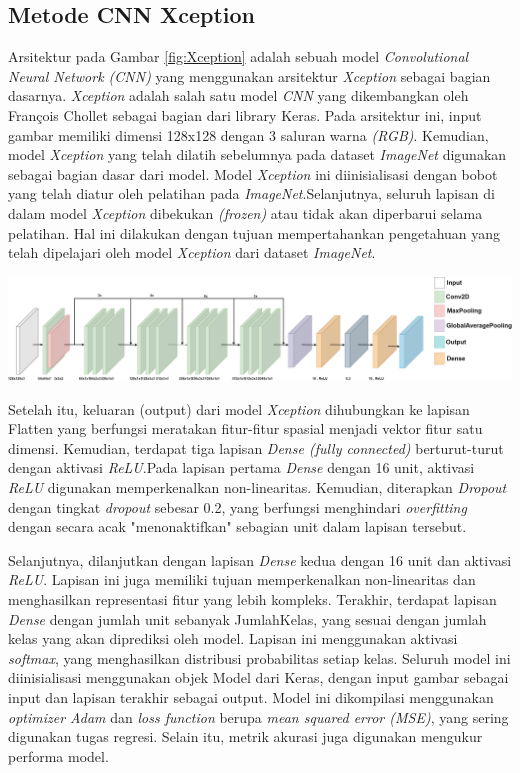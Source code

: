 \subsection{Metode CNN Xception}
Arsitektur pada Gambar \ref{fig:Xception} adalah sebuah model \textit{Convolutional Neural Network (\textit{CNN})} yang menggunakan arsitektur \textit{Xception} sebagai bagian dasarnya. \textit{Xception} adalah salah satu model \textit{CNN} yang dikembangkan oleh François Chollet sebagai bagian dari library Keras. Pada arsitektur ini, input gambar memiliki dimensi 128x128 dengan 3 saluran warna \textit{(RGB)}. Kemudian, model \textit{Xception} yang telah dilatih sebelumnya pada dataset \textit{ImageNet} digunakan sebagai bagian dasar dari model. Model \textit{Xception} ini diinisialisasi dengan bobot yang telah diatur oleh pelatihan pada \textit{ImageNet}.Selanjutnya, seluruh lapisan di dalam model \textit{Xception} dibekukan \textit{(frozen)} atau tidak akan diperbarui selama pelatihan. Hal ini dilakukan dengan tujuan mempertahankan pengetahuan yang telah dipelajari oleh model \textit{Xception} dari dataset \textit{ImageNet}.

\begin{center}
	\includegraphics[width=1.0\linewidth]{gambar/bener//Arsitektur_CNNXception_Modifikasi.png}
	\label{fig:Xception}
\end{center}
Setelah itu, keluaran (output) dari model \textit{Xception} dihubungkan ke lapisan Flatten yang berfungsi meratakan fitur-fitur spasial menjadi vektor fitur satu dimensi. Kemudian, terdapat tiga lapisan \textit{Dense (fully connected)} berturut-turut dengan aktivasi \textit{ReLU}.Pada lapisan pertama \textit{Dense} dengan 16 unit, aktivasi \textit{ReLU} digunakan memperkenalkan non-linearitas. Kemudian, diterapkan \textit{Dropout} dengan tingkat \textit{dropout} sebesar 0.2, yang berfungsi menghindari \textit{overfitting} dengan secara acak "menonaktifkan" sebagian unit dalam lapisan tersebut.

Selanjutnya, dilanjutkan dengan lapisan \textit{Dense} kedua dengan 16 unit dan aktivasi \textit{ReLU}. Lapisan ini juga memiliki tujuan memperkenalkan non-linearitas dan menghasilkan representasi fitur yang lebih kompleks. Terakhir, terdapat lapisan \textit{Dense} dengan jumlah unit sebanyak JumlahKelas, yang sesuai dengan jumlah kelas yang akan diprediksi oleh model. Lapisan ini menggunakan aktivasi \textit{softmax}, yang menghasilkan distribusi probabilitas setiap kelas. Seluruh model ini diinisialisasi menggunakan objek Model dari Keras, dengan input gambar sebagai input dan lapisan terakhir sebagai output. Model ini dikompilasi menggunakan \textit{optimizer Adam} dan \textit{loss function} berupa\textit{ mean squared error (MSE)}, yang sering digunakan tugas regresi. Selain itu, metrik akurasi juga digunakan mengukur performa model.

